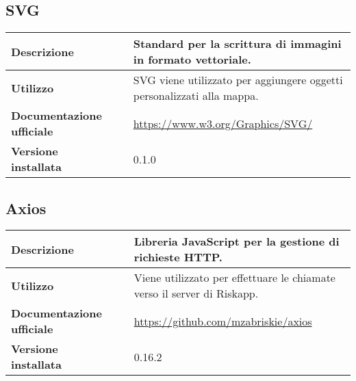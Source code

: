 \vspace{40px}
\subsection{SVG}
\label{SVG}
\begin{table}[H]
	\centering
	\begin{tabular}{p{2cm}p{0.5cm}p{11.5cm}}
		\arrayrulecolor{lightgray}
		\toprule
		\textbf{Descrizione} & &
		Standard per la scrittura di immagini in formato vettoriale.
		\\ \midrule
		\textbf{Utilizzo} & &
		SVG viene utilizzato per aggiungere oggetti personalizzati alla mappa.
		\\ \midrule
		\textbf{Documentazione ufficiale} & &
		\url{https://www.w3.org/Graphics/SVG/}
		\\ \midrule
		\textbf{Versione installata} & &
		0.1.0
		\\\bottomrule
	\end{tabular}
\end{table}

\vspace{40px}
\subsection{Axios}
\label{Axios}
\begin{table}[H]
	\centering
	\begin{tabular}{p{2cm}p{0.5cm}p{11.5cm}}
		\arrayrulecolor{lightgray}
		\toprule
		\textbf{Descrizione} & &
		Libreria JavaScript per la gestione di richieste HTTP.
		\\ \midrule
		\textbf{Utilizzo} & &
		Viene utilizzato per effettuare le chiamate verso il server di Riskapp.
		\\ \midrule
		\textbf{Documentazione ufficiale} & &
		\url{https://github.com/mzabriskie/axios}
		\\ \midrule
		\textbf{Versione installata} & &
		0.16.2
		\\\bottomrule
	\end{tabular}
\end{table}
